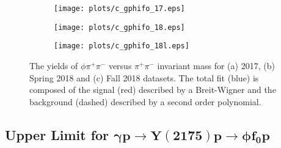 \begin{center}
\null
\vfill
\begin{figure}[htbp]
    \centering
    \begin{subfigure}[b]{0.49\textwidth}
        \texttt{[image: plots/c\_gphifo\_17.eps]}
        \caption{}
        \label{fig.xsec_ul.phifo.3.a}
    \end{subfigure}
    \begin{subfigure}[b]{0.49\textwidth}
        \texttt{[image: plots/c\_gphifo\_18.eps]}
        \caption{}
        \label{fig.xsec_ul.phifo.3.b}
    \end{subfigure}
    \begin{subfigure}[b]{0.49\textwidth}
        \texttt{[image: plots/c\_gphifo\_18l.eps]}
        \caption{}
        \label{fig.xsec_ul.phifo.3.c}
    \end{subfigure}
    \caption{The yields of $\phi \pi^+ \pi^-$ versus $\pi^+ \pi^-$ invariant mass for (a) 2017, (b) Spring 2018 and (c) Fall 2018 datasets. The total fit (blue) is composed of the signal (red) described by a Breit-Wigner and the background (dashed) described by a second order polynomial.}
    \label{fig.xsec_ul.phifo.3}
\end{figure}
\null
\vfill
\end{center}

\newpage
\subsection{Upper Limit for \texorpdfstring{$\bm{\gamma p \rightarrow Y(2175) p \rightarrow \phi f_0 p}$}{}}
\label{sec.xsec_ul.yphifo}

